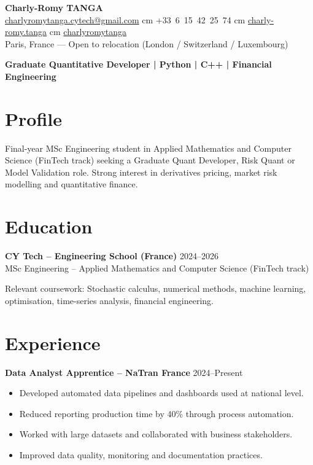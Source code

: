 \documentclass[10pt, letterpaper]{article}
\begin{document}
\begin{center}
    \textbf{\LARGE Charly-Romy TANGA} \\[0.2cm]
    \mbox{\href{mailto:charlyromytanga.cytech@gmail.com}{\footnotesize\faEnvelope\hspace*{0.1cm}charlyromytanga.cytech@gmail.com}}
     cm
    \mbox{\faPhone\hspace*{0.1cm}+33 6 15 42 25 74}
     cm
    \mbox{\href{https://www.linkedin.com/in/charly-romy-tanga}{\footnotesize\faLinkedin\hspace*{0.1cm}charly-romy.tanga}}
     cm
    \mbox{\href{https://github.com/charlyromytanga}{\footnotesize\faGithub\hspace*{0.1cm}charlyromytanga}}
    \\[0.2cm]
    Paris, France --- Open to relocation (London / Switzerland / Luxembourg)
\end{center}

\vspace{0.2cm}
\textbf{Graduate Quantitative Developer | Python | C++ | Financial Engineering}

\section*{Profile}
Final-year MSc Engineering student in Applied Mathematics and Computer Science (FinTech track) seeking a Graduate Quant Developer, Risk Quant or Model Validation role. Strong interest in derivatives pricing, market risk modelling and quantitative finance.

\section*{Education}
\textbf{CY Tech -- Engineering School (France)} \hfill 2024--2026\\
MSc Engineering -- Applied Mathematics and Computer Science (FinTech track)

Relevant coursework: Stochastic calculus, numerical methods, machine learning, optimisation, time-series analysis, financial engineering.

\section*{Experience}
\textbf{Data Analyst Apprentice -- NaTran France} \hfill 2024--Present
\begin{itemize}[leftmargin=0.5cm]
\item Developed automated data pipelines and dashboards used at national level.
\item Reduced reporting production time by 40\% through process automation.
\item Worked with large datasets and collaborated with business stakeholders.
\item Improved data quality, monitoring and documentation practices.
\end{itemize}
\end{document}
